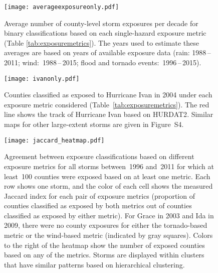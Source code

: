 \clearpage

\begin{figure}%
\centering
\texttt{[image: averageexposureonly.pdf]} 
\caption{Average number of county-level storm exposures per decade for binary 
	classifications based on each
	single-hazard exposure metric (Table \ref{tab:exposuremetrics}). The years used to
	estimate these averages are based on years of available exposure data
	(rain: 1988\,--\,2011; wind:~1988\,--\,2015; flood and
	tornado events:~1996\,--\,2015). } 
\label{fig:averageexposure} 
\end{figure}

\clearpage

\begin{figure}%
\centering
\texttt{[image: ivanonly.pdf]}
\caption{Counties classified as exposed to Hurricane Ivan in 2004 under each
	exposure metric considered (Table~\ref{tab:exposuremetrics}). The red
	line shows the track of Hurricane Ivan based on
	\ac{HURDAT2}.  Similar maps for other
	large-extent storms are given in Figure~S4.
	}
\label{fig:ivanexposure} 
\end{figure}

\clearpage

\begin{figure}%
	\centering 
	\texttt{[image: jaccard\_heatmap.pdf]}
	\caption{Agreement between exposure
	classifications based on different exposure metrics for all storms
	between~1996 and~2011 for which at least~100 counties were exposed
	based on at least one metric.  Each row shows one storm, and the color
	of each cell shows the measured Jaccard index for each pair of exposure
	metrics (proportion of counties classified as exposed by both metrics
	out of counties classified as exposed by either metric). For 
	Grace in 2003 and Ida in 2009, there were no county exposures for
	either the tornado-based metric or the wind-based metric (indicated 
	by gray squares). Colors to the right of the
	heatmap show the number of exposed counties
	based on any of the metrics. Storms are displayed
	within clusters that have similar patterns based on hierarchical 
	clustering.}
\label{fig:jaccard} 
\end{figure}


